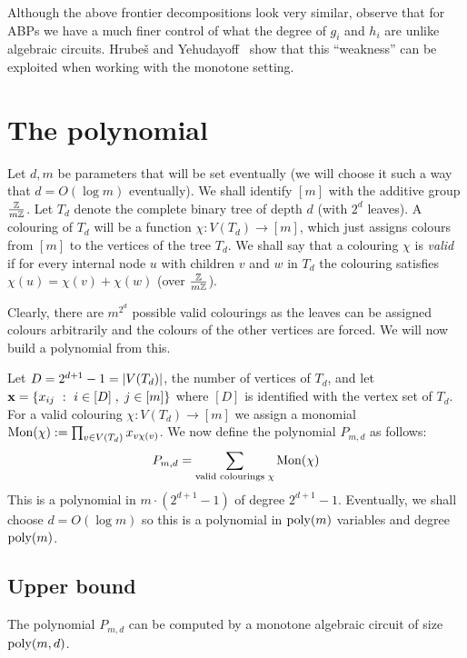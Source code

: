 Although the above frontier decompositions look very similar, observe that for ABPs we have a much finer control of what the degree of $g_i$ and $h_i$ are unlike algebraic circuits. Hrube\v{s} and Yehudayoff~\cite{HY16} show that this ``weakness'' can be exploited when working with the monotone setting. 

\section{The polynomial}

Let $d,m$ be parameters that will be set eventually (we will choose it such a way that $d = O(\log m)$ eventually).
We shall identify $[m]$ with the additive group $\frac{\mathbb{Z}}{m\mathbb{Z}}$. Let $T_d$ denote the complete binary tree of depth $d$ (with $2^d$ leaves). A colouring of $T_d$ will be a function $\chi:V(T_d) \rightarrow [m]$, which just assigns colours from $[m]$ to the vertices of the tree $T_d$. We shall say that a colouring $\chi$ is \emph{valid} if for every internal node $u$ with children $v$ and $w$ in $T_d$ the colouring satisfies $\chi(u) = \chi(v) + \chi(w)$ (over $\frac{\mathbb{Z}}{m\mathbb{Z}}$).

Clearly, there are $m^{2^d}$ possible valid colourings as the leaves can be assigned colours arbitrarily and the colours of the other vertices are forced. We will now build a polynomial from this.

Let $D = 2^{d+1}-1= \left|V(T_d)\right|$, the number of vertices of $T_d$, and let $\mathbf{x} = \left\{{x_{ij}}\ : \ {i\in [D]\;,\;j\in [m]}\right\}$ where $[D]$ is identified with the vertex set of $T_d$.
For a valid colouring $\chi:V(T_d)\rightarrow [m]$ we  assign a monomial $\operatorname{Mon}(\chi) := \prod_{v\in V(T_d)} x_{v\chi(v)}$. We now define the polynomial $P_{m,d}$ as follows:
\[
  P_{m,d} = \sum_{\text{valid colourings } \chi} \operatorname{Mon}(\chi)
\]
This is a polynomial in $m \cdot (2^{d+1} - 1)$ of degree $2^{d+1}-1$. Eventually, we shall choose $d = O(\log m)$ so this is a polynomial in $\operatorname{poly}(m)$ variables and degree $\operatorname{poly}(m)$. 

\subsection*{Upper bound}

\begin{lemma}\label{lem:MonSep-upper-bound}
  The polynomial $P_{m,d}$ can be computed by a monotone algebraic circuit of size $\operatorname{poly}(m,d)$. 
\end{lemma}

